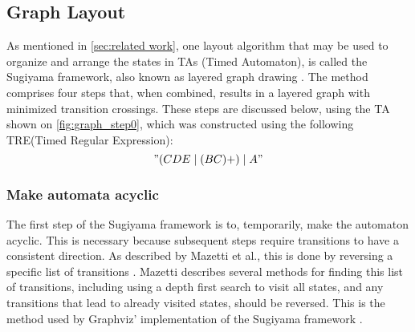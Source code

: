 \subsection{Graph Layout}\label{subsec:graphlayout}





As mentioned in \cref{sec:related work}, one layout algorithm that may be used to organize and arrange the states in TAs (Timed Automaton), is called the Sugiyama framework, also known as layered graph drawing \cite{Sugiyama1981}. The method comprises four steps that, when combined, results in a layered graph with minimized transition crossings. These steps are discussed below, using the TA shown on \cref{fig:graph_step0}, which was constructed using the following TRE(Timed Regular Expression): $$"(CDE\mid(BC)+)\mid A"$$

\begin{center}
    
\end{center}

\subsubsection{Make automata acyclic}
The first step of the Sugiyama framework is to, temporarily, make the automaton acyclic. This is necessary because subsequent steps require transitions to have a consistent direction. As described by Mazetti et al., this is done by reversing a specific list of transitions \cite{Mazetti2012}.
Mazetti describes several methods for finding this list of transitions, including using a depth first search to visit all states, and any transitions that lead to already visited states, should be reversed.
This is the method used by Graphviz' implementation of the Sugiyama framework \cite{Graphviz}. %

